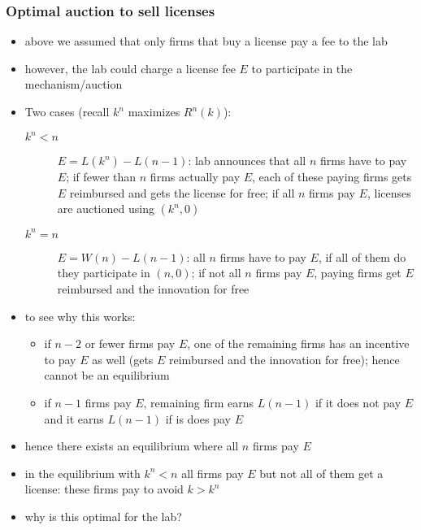 \documentclass[11pt,english]{beamer}
\begin{document}
\begin{frame}[allowframebreaks]\frametitle{Optimal auction to sell licenses}
\label{sec-2-6}
\begin{itemize}

\item above we assumed that only firms that buy a license pay a fee to the lab\\
\label{sec-2-6-1}%
\item however, the lab could charge a license fee $E$ to participate in the mechanism/auction\\
\label{sec-2-6-2}%
\item Two cases (recall $k^n$ maximizes $R^n(k)$):
\label{sec-2-6-3}%
\begin{description}
\item[$k^n<n$] $E=L(k^n)-L(n-1)$: lab announces that all $n$ firms
have to pay $E$; if fewer than $n$ firms actually pay $E$, each of
these paying firms gets $E$ reimbursed and gets the license for free;
if all $n$ firms pay $E$, licenses are auctioned using $(k^n,0)$
\item[$k^n=n$] $E=W(n)-L(n-1)$: all $n$ firms have to pay $E$, if all
of them do they participate in $(n,0)$; if not all $n$ firms pay $E$,
paying firms get $E$ reimbursed and the innovation for free
\end{description}

\item to see why this works:
\label{sec-2-6-4}%
\begin{itemize}

\item if $n-2$ or fewer firms pay $E$, one of the remaining firms has an incentive to pay $E$ as well (gets $E$ reimbursed and the innovation for free); hence cannot be an equilibrium\\
\label{sec-2-6-4-1}%
\item if $n-1$ firms pay $E$, remaining firm earns $L(n-1)$ if it does not pay $E$ and it earns $L(n-1)$ if is does pay $E$\\
\label{sec-2-6-4-2}%
\end{itemize} %

\item hence there exists an equilibrium where all $n$ firms pay $E$\\
\label{sec-2-6-5}%
\item in the equilibrium with $k^{n}<n$ all firms pay $E$ but not all of them get a license: these firms pay to avoid $k>k^{n}$\\
\label{sec-2-6-6}%
\item why is this optimal for the lab?
\label{sec-2-6-7}%
\begin{itemize}


\end{itemize}
\end{itemize}
\end{frame}
\end{document}
